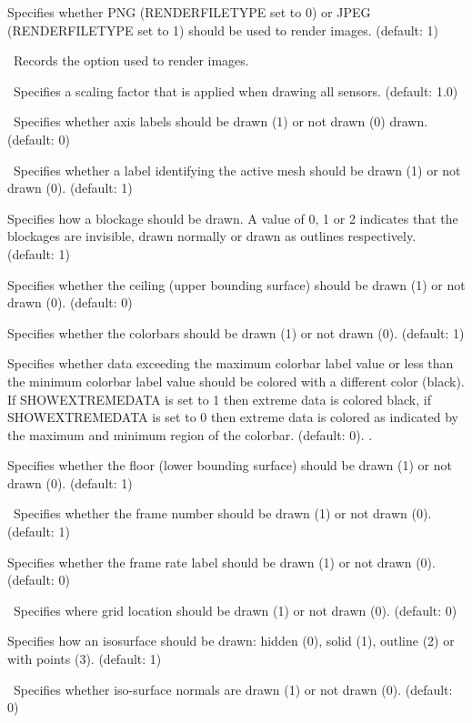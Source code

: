\documentclass[11pt,twoside]{book}
\begin{document}
Specifies whether PNG (RENDERFILETYPE set to 0) or
JPEG (RENDERFILETYPE set to 1)
should be used to render images.  (default: 1)

\ Records the option used to render images.

\ Specifies a scaling factor that is applied when
drawing all sensors.  (default: 1.0)

\ Specifies whether axis labels should
be drawn (1) or not drawn (0) drawn. (default: 0)

\ Specifies whether a label identifying the
active mesh should be drawn (1) or not drawn (0). (default: 1)

Specifies how a blockage should
be drawn.  A value of 0, 1 or 2 indicates that the blockages are
invisible, drawn normally or drawn as outlines respectively.  (default: 1)

Specifies whether
the ceiling (upper bounding surface) should be drawn (1) or not drawn (0).
(default: 0)


Specifies whether
the colorbars should be drawn (1) or not drawn (0).
(default: 1)

Specifies whether data exceeding the maximum colorbar
label value or less than the minimum colorbar label value should be colored
with a different color (black).  If SHOWEXTREMEDATA is set to 1 then extreme
data is colored black, if SHOWEXTREMEDATA is set to 0 then extreme data is
colored as indicated by the maximum and minimum region of the colorbar. (default: 0).  .

Specifies whether
the floor (lower bounding surface) should be drawn (1) or not drawn
(0).
(default: 1)

\ Specifies whether the frame number
should be drawn (1) or not drawn (0). (default: 1)

Specifies whether
the frame rate label should be drawn (1) or not drawn (0).
(default: 0)

\ Specifies where grid location should be drawn (1) or not
drawn (0). (default: 0)

Specifies how an isosurface should be drawn: hidden (0),
solid (1), outline (2) or with points (3).  (default: 1)

\ Specifies whether iso-surface normals are drawn
(1) or not drawn (0).  (default: 0)
\end{document}
